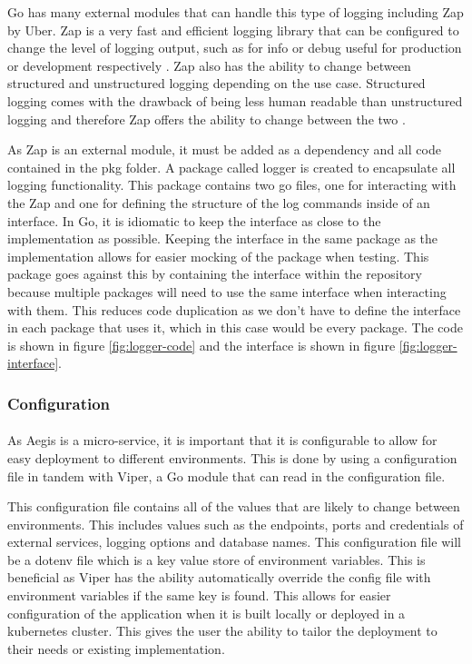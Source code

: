 \documentclass[12pt, conference, final, a4paper, onecolumn, compsoc]{IEEEtran}
\begin{document}
Go has many external modules that can handle this type of logging including Zap
by Uber. Zap is a very fast and efficient logging library that can be configured
to change the level of logging output, such as for info or debug useful for
production or development respectively \citep{zap-repo}. Zap also has the
ability to change between structured and unstructured logging depending on the
use case. Structured logging comes with the drawback of being less human
readable than unstructured logging and therefore Zap offers the ability to
change between the two \citep{zap-repo}.


As Zap is an external module, it must be added as a dependency and all code
contained in the pkg folder. A package called logger is created to encapsulate
all logging functionality. This package contains two go files, one for
interacting with the Zap and one for defining the structure of the log commands
inside of an interface. In Go, it is idiomatic to keep the interface as close to
the implementation as possible. Keeping the interface in the same package as the
implementation allows for easier mocking of the package when testing. This
package goes against this by containing the interface within the repository
because multiple packages will need to use the same interface when interacting
with them. This reduces code duplication as we don't have to define the
interface in each package that uses it, which in this case would be every
package. The code is shown in figure \ref{fig:logger-code} and the interface is
shown in figure \ref{fig:logger-interface}.


\subsubsection*{Configuration}
\paragraph{}

As Aegis is a micro-service, it is important that it is configurable to allow
for easy deployment to different environments. This is done by using a
configuration file in tandem with Viper, a Go module that can read in the
configuration file.

This configuration file contains all of the values that are likely to change
between environments. This includes values such as the endpoints, ports and
credentials of external services, logging options and database names. This
configuration file will be a dotenv file which is a key value store of
environment variables. This is beneficial as Viper has the ability automatically
override the config file with environment variables if the same key is found.
This allows for easier configuration of the application when it is built locally
or deployed in a kubernetes cluster. This gives the user the ability to tailor
the deployment to their needs or existing implementation.
\end{document}
